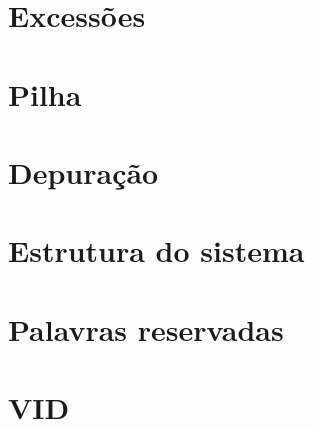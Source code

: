 \documentclass[12pt]{article}
\begin{document}
\section{Excessões}
\section{Pilha}
\section{Depuração}
\section{Estrutura do sistema}
\section{Palavras reservadas}
\section{VID}
\end{document}
